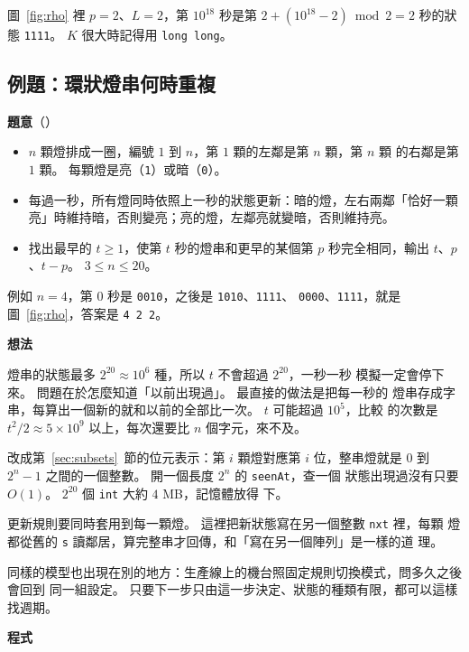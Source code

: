 圖~\ref{fig:rho} 裡 $p = 2$、$L = 2$，第 $10^{18}$ 秒是第
$2 + (10^{18} - 2) \bmod 2 = 2$ 秒的狀態 \texttt{1111}。 $K$ 很大時記得用
\texttt{long long}。

\subsection{例題：環狀燈串何時重複}
\label{sec:ex-lamps}

\textbf{題意}（）

\begin{itemize}
\item $n$ 顆燈排成一圈，編號 $1$ 到 $n$，第 $1$ 顆的左鄰是第 $n$ 顆，第 $n$ 顆
的右鄰是第 $1$ 顆。 每顆燈是亮（\texttt{1}）或暗（\texttt{0}）。
\item 每過一秒，所有燈同時依照上一秒的狀態更新：暗的燈，左右兩鄰「恰好一顆
亮」時維持暗，否則變亮；亮的燈，左鄰亮就變暗，否則維持亮。
\item 找出最早的 $t \ge 1$，使第 $t$ 秒的燈串和更早的某個第 $p$ 秒完全相同，輸出
$t$、$p$、$t - p$。 $3 \le n \le 20$。
\end{itemize}

例如 $n = 4$，第 $0$ 秒是 \texttt{0010}，之後是 \texttt{1010}、\texttt{1111}、
\texttt{0000}、\texttt{1111}，就是圖~\ref{fig:rho}，答案是 \texttt{4 2 2}。

\textbf{想法}

燈串的狀態最多 $2^{20} \approx 10^6$ 種，所以 $t$ 不會超過 $2^{20}$，一秒一秒
模擬一定會停下來。 問題在於怎麼知道「以前出現過」。 最直接的做法是把每一秒的
燈串存成字串，每算出一個新的就和以前的全部比一次。 $t$ 可能超過 $10^5$，比較
的次數是 $t^2 / 2 \approx 5 \times 10^9$ 以上，每次還要比 $n$ 個字元，來不及。

改成第~\ref{sec:subsets}~節的位元表示：第 $i$ 顆燈對應第 $i$ 位，整串燈就是
$0$ 到 $2^n - 1$ 之間的一個整數。 開一個長度 $2^n$ 的 \texttt{seenAt}，查一個
狀態出現過沒有只要 $O(1)$。 $2^{20}$ 個 \texttt{int} 大約 $4$ MB，記憶體放得
下。

更新規則要同時套用到每一顆燈。 這裡把新狀態寫在另一個整數 \texttt{nxt} 裡，每顆
燈都從舊的 \texttt{s} 讀鄰居，算完整串才回傳，和「寫在另一個陣列」是一樣的道
理。

同樣的模型也出現在別的地方：生產線上的機台照固定規則切換模式，問多久之後會回到
同一組設定。 只要下一步只由這一步決定、狀態的種類有限，都可以這樣找週期。

\textbf{程式}

